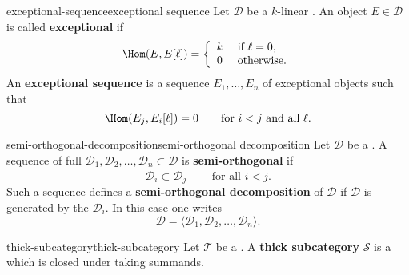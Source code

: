 \begin{topic}{exceptional-sequence}{exceptional sequence}
    Let $\mathcal{D}$ be a $k$-linear . An object $E \in \mathcal{D}$ is called \textbf{exceptional} if
    \[ \Hom(E, E[\ell]) = \left\{\begin{array}{cl} k & \text{ if } \ell = 0, \\ 0 & \text{ otherwise.} \end{array}\right. \]
    An \textbf{exceptional sequence} is a sequence $E_1, \ldots, E_n$ of exceptional objects such that
    \[ \Hom(E_j, E_i[\ell]) = 0 \qquad \text{for $i < j$ and all $\ell$}. \]
\end{topic}

\begin{topic}{semi-orthogonal-decomposition}{semi-orthogonal decomposition}
    Let $\mathcal{D}$ be a . A sequence of full   $\mathcal{D}_1, \mathcal{D}_2, \ldots, \mathcal{D}_n \subset \mathcal{D}$ is \textbf{semi-orthogonal} if
    \[ \mathcal{D}_i \subset \mathcal{D}_j^\perp \qquad \text{for all $i < j$}. \]
    Such a sequence defines a \textbf{semi-orthogonal decomposition} of $\mathcal{D}$ if $\mathcal{D}$ is generated by the $\mathcal{D}_i$. In this case one writes
    \[ \mathcal{D} = \langle \mathcal{D}_1, \mathcal{D}_2, \ldots, \mathcal{D}_n \rangle . \]
\end{topic}

\begin{topic}{thick-subcategory}{thick-subcategory}
    Let $\mathcal{T}$ be a . A \textbf{thick subcategory} $\mathcal{S}$ is a   which is closed under taking summands.
\end{topic}
